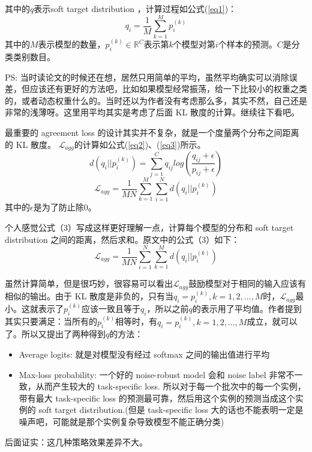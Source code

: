 \documentclass{article}
\begin{document}
其中的$q$表示soft target distribution ，计算过程如公式(\ref{eq1})：
\begin{equation}
    q_i=\frac{1}{M}\sum_{k=1}^{M}{p_i^{(k)}} \label{eq1}
\end{equation}
其中的$M$表示模型的数量，$p_i^{(k)}\in \mathbb{R}^C$表示第$k$个模型对第$i$个样本的预测。$C$是分类类别数目。


PS: 当时读论文的时候还在想，居然只用简单的平均，虽然平均确实可以消除误差，但应该还有更好的方法吧，比如如果模型经常振荡，给一下比较小的权重之类的，或者动态权重什么的。当时还以为作者没有考虑那么多，其实不然，自己还是非常的浅薄呀。这里用平均其实是考虑了后面 KL 散度的计算。继续往下看吧。

最重要的 agreement loss 的设计其实并不复杂，就是一个度量两个分布之间距离的 KL 散度。 $\mathcal{L}_{agg}$的计算如公式(\ref{eq2})、(\ref{eq3})所示。
\begin{equation}
    d(q_i||p_i^{(k)}) = \sum_{j=1}^{C}{q_{ij}log(\frac{q_{ij}+\epsilon}{p_{ij}+\epsilon})}
    \label{eq2}
\end{equation}
\begin{equation}
    \mathcal{L}_{agg} = \frac{1}{MN} \sum_{k=1}^{M}{\sum_{i=1}^{N}{d(q_i||p_i^{(k)})}}
    \label{eq3}
\end{equation}
其中的$\epsilon$是为了防止除0。

个人感觉公式（3）写成这样更好理解一点，计算每个模型的分布和 soft target distribution 之间的距离，然后求和。原文中的公式（3）如下：
\begin{equation}
    \mathcal{L}_{agg} = \frac{1}{MN} \sum_{i=1}^{N}{\sum_{k=1}^{M}{d(q_i||p_i^{(k)})}}
\end{equation}

虽然计算简单，但是很巧妙，很容易可以看出$\mathcal{L}_{agg}$鼓励模型对于相同的输入应该有相似的输出。由于 KL 散度是非负的，只有当$q_i=p_i^{(k)}, k=1,2,\ldots,M$时，$\mathcal{L}_{agg}$最小。这就表示了$p_i^{(k)}$应该一致且等于$q_i$，所以之前$q$的表示用了平均值。作者提到其实只要满足：当所有的$p_i^{(k)}$相等时，有$q_i=p_i^{(k)}, k=1,2,\ldots,M$成立，就可以了。所以又提出了两种得到$q$的方法：
\begin{itemize}
    \item Average logits: 就是对模型没有经过 softmax 之间的输出值进行平均
    \item Max-loss probability: 一个好的 noise-robust model 会和 noise label 非常不一致，从而产生较大的 task-specific loss. 所以对于每一个批次中的每一个实例，带有最大 task-specific loss 的预测最可靠，然后用这个实例的预测当成这个实例的 soft target distribution.(但是 task-specific loss 大的话也不能表明一定是噪声吧，可能就是那个实例复杂导致模型不能正确分类)
\end{itemize}
后面证实：这几种策略效果差异不大。
\end{document}
